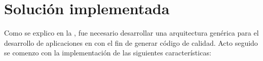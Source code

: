 \chapter{Solución implementada}

Como se explico en la , fue necesario desarrollar una arquitectura genérica para el desarrollo de aplicaciones en \meteorNAME con el fin de generar código de calidad. Acto seguido se comenzo con la implementación de las siguientes características:
















